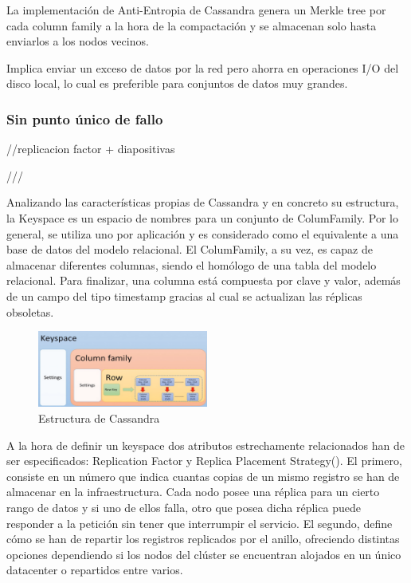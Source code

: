 La implementación de Anti-Entropia de Cassandra genera un Merkle tree por cada column family a la hora de la compactación y se almacenan solo hasta enviarlos a los nodos vecinos. 

Implica enviar un exceso de datos por la red pero ahorra en operaciones I/O del disco local, lo cual es preferible para conjuntos de datos muy grandes.

\subsubsection{Sin punto único de fallo}

//replicacion factor + diapositivas

///

Analizando las características propias de Cassandra y en concreto su estructura, la Keyspace es un espacio de nombres para un conjunto de ColumFamily. Por lo general, se utiliza uno por aplicación y es considerado como el equivalente a una base de datos del modelo relacional. El ColumFamily, a su vez, es capaz de almacenar diferentes columnas, siendo el homólogo de una tabla del modelo relacional. Para finalizar, una columna está compuesta por clave y valor, además de un campo del tipo timestamp gracias al cual se actualizan las réplicas obsoletas.\\

\begin{figure}[h]
	\centering
	\includegraphics[width=0.5\textwidth]{Ilustraciones/cassandra_infraestructure.png}
	\caption{Estructura de Cassandra}
	\label{fig:cassandra_infraestructure}
\end{figure}

A la hora de definir un keyspace dos atributos estrechamente relacionados han de ser especificados: Replication Factor y Replica Placement Strategy(). El primero, consiste en un número que indica cuantas copias de un mismo registro se han de almacenar en la infraestructura. Cada nodo posee una réplica para un cierto rango de datos y si uno de ellos falla, otro que posea dicha réplica puede responder a la petición sin tener que interrumpir el servicio. El segundo, define cómo se han de repartir los registros replicados por el anillo, ofreciendo distintas opciones dependiendo si los nodos del clúster se encuentran alojados en un único datacenter o repartidos entre varios.\\

